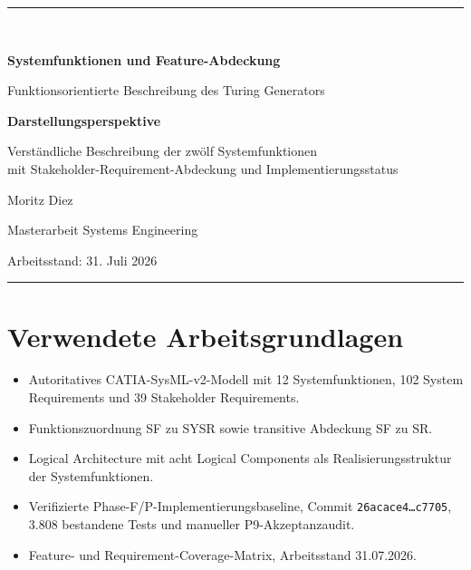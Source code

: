 \documentclass[11pt,a4paper]{scrartcl}
\begin{document}
\begin{titlepage}
  \centering
  \vspace*{2.0cm}
  {\color{TuringBlue}\rule{\textwidth}{1.2pt}}\\[1.2cm]
  {\Huge\bfseries\color{TuringBlue}
  Systemfunktionen und Feature-Abdeckung\par}
  \vspace{0.7cm}
  {\Large Funktionsorientierte Beschreibung des Turing Generators\par}
  \vspace{1.4cm}

  \begin{tcolorbox}[
    width=0.84\textwidth,
    colback=blue!3,
    colframe=TuringBlue,
    arc=2mm,
    boxrule=0.8pt
  ]
  \centering
  \textbf{Darstellungsperspektive}\par
  Verständliche Beschreibung der zwölf Systemfunktionen\\
  mit Stakeholder-Requirement-Abdeckung und Implementierungsstatus
  \end{tcolorbox}

  \vfill
  {\large Moritz Diez\par}
  \vspace{3mm}
  {\normalsize Masterarbeit Systems Engineering\par}
  \vspace{8mm}
  {\normalsize Arbeitsstand: 31. Juli 2026\par}
  \vspace{1.3cm}
  {\color{TuringBlue}\rule{\textwidth}{1.2pt}}
\end{titlepage}

\tableofcontents
\clearpage



\clearpage
\section*{Verwendete Arbeitsgrundlagen}
\begin{itemize}[leftmargin=7mm,itemsep=2mm]
  \item Autoritatives CATIA-SysML-v2-Modell mit 12 Systemfunktionen,
  102 System Requirements und 39 Stakeholder Requirements.
  \item Funktionszuordnung SF zu SYSR sowie transitive Abdeckung SF zu SR.
  \item Logical Architecture mit acht Logical Components als
  Realisierungsstruktur der Systemfunktionen.
  \item Verifizierte Phase-F/P-Implementierungsbaseline,
  Commit \texttt{26acace4\ldots c7705}, 3.808 bestandene Tests und
  manueller P9-Akzeptanzaudit.
  \item Feature- und Requirement-Coverage-Matrix,
  Arbeitsstand 31.07.2026.
\end{itemize}
\end{document}
